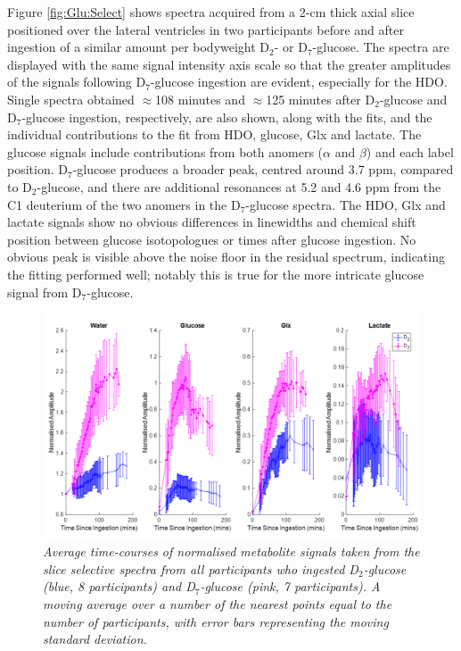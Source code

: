 Figure \ref{fig:Glu:Select} shows spectra acquired from a 2-cm thick axial slice positioned over the lateral ventricles in two participants before and after ingestion of a similar amount per bodyweight D$_2$- or D$_7$-glucose. The spectra are displayed with the same signal intensity axis scale so that the greater amplitudes of the signals following D$_7$-glucose ingestion are evident, especially for the \ac{HDO}. Single spectra obtained $\approx$108 minutes and $\approx$125 minutes after D$_2$-glucose and D$_7$-glucose ingestion, respectively, are also shown, along with the fits, and the individual contributions to the fit from \ac{HDO}, glucose, Glx and lactate. The glucose signals include contributions from both anomers ($\alpha$ and $\beta$) and each label position. D$_7$-glucose produces a broader peak, centred around 3.7 ppm, compared to D$_2$-glucose, and there are additional resonances at 5.2 and 4.6 ppm from the C1 deuterium of the two anomers in the D$_7$-glucose spectra. The \ac{HDO}, Glx and lactate signals show no obvious differences in linewidths and chemical shift position between glucose isotopologues or times after glucose ingestion. No obvious peak is visible above the noise floor in the residual spectrum, indicating the fitting performed well; notably this is true for the more intricate glucose signal from D$_7$-glucose.

\begin{figure}
    \centering
    \includegraphics[width = 1\textwidth]{Figures/Glucose/Bulk_Time.png}
    \caption{\textit{Average time-courses of normalised metabolite signals taken from the slice selective spectra from all participants who ingested D$_2$-glucose (blue, 8 participants) and D$_7$-glucose (pink, 7 participants). A moving average over a number of the nearest points equal to the number of participants, with error bars representing the moving standard deviation.}}
    \label{fig:Glu:Select_Time}
\end{figure}

